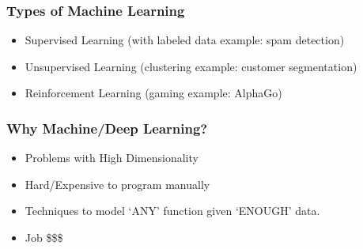 \begin{frame}[fragile]\frametitle{ Types of Machine Learning}
\begin{itemize}
\item Supervised Learning (with labeled data example: spam detection)
\item Unsupervised Learning (clustering example: customer segmentation)
\item Reinforcement Learning (gaming example: AlphaGo)
\end{itemize}
\end{frame}


\begin{frame}[fragile]\frametitle{Why Machine/Deep Learning?}
\begin{itemize}
\item Problems with High Dimensionality
\item Hard/Expensive to program manually
\item Techniques to model `ANY' function given `ENOUGH' data.
\item Job \$\$\$
\end{itemize}
\end{frame}



